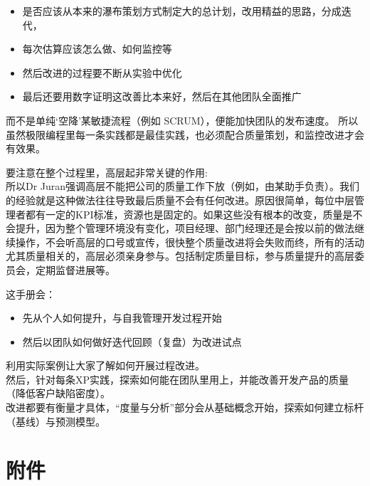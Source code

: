 \documentclass{book}        %
\providecommand{\tightlist}{%
  \setlength{\itemsep}{0pt}\setlength{\parskip}{0pt}}
\begin{document}
\begin{itemize}
\tightlist
\item
  是否应该从本来的瀑布策划方式制定大的总计划，改用精益的思路，分成迭代，
\item
  每次估算应该怎么做、如何监控等
\item
  然后改进的过程要不断从实验中优化
\item
  最后还要用数字证明这改善比本来好，然后在其他团队全面推广\\
\end{itemize}

而不是单纯`空降'某敏捷流程（例如 SCRUM），便能加快团队的发布速度。
所以虽然极限编程里每一条实践都是最佳实践，也必须配合质量策划，和监控改进才会有效果。


要注意在整个过程里，高层起非常关键的作用:\\
所以Dr
Juran强调高层不能把公司的质量工作下放（例如，由某助手负责）。我们的经验就是这种做法往往导致最后质量不会有任何改进。原因很简单，每位中层管理者都有一定的KPI标准，资源也是固定的。如果这些没有根本的改变，质量是不会提升，因为整个管理环境没有变化，项目经理、部门经理还是会按以前的做法继续操作，不会听高层的口号或宣传，很快整个质量改进将会失败而终，所有的活动尤其质量相关的，高层必须亲身参与。包括制定质量目标，参与质量提升的高层委员会，定期监督进展等。

这手册会：

\begin{itemize}
\tightlist
\item
  先从个人如何提升，与自我管理开发过程开始
\item
  然后以团队如何做好迭代回顾（复盘）为改进试点\\
\end{itemize}

利用实际案例让大家了解如何开展过程改进。\\
然后，针对每条XP实践，探索如何能在团队里用上，并能改善开发产品的质量（降低客户缺陷密度）。\\
改进都要有衡量才具体，``度量与分析''部分会从基础概念开始，探索如何建立标杆（基线）与预测模型。\\

\hypertarget{ux9644ux4ef6}{%
\section{附件}\label{ux9644ux4ef6}}
\end{document}
